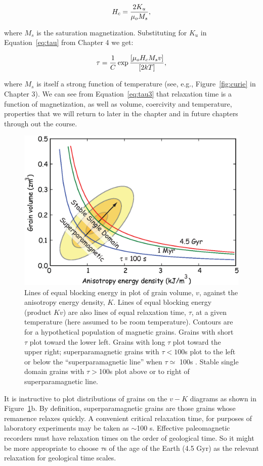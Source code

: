  $$H_c= {{2 K_u}\over{\mu_o M_s}},$$
 
 \noindent where $M_s$ is the saturation magnetization.  Substituting for $K_u$ in Equation~\ref{eq:tau} from Chapter 4  we get:

\begin{equation}
{\tau } =
{{1\over C} \exp {{[\mu_o H_c M_s v]}\over {[2kT]}}},
\label{eq:tau3}
\end{equation}

\noindent  where  $M_s$ is itself a  strong function of temperature (see, e.g., Figure~\ref{fig:curie} in Chapter 3).  
We can see from Equation~\ref{eq:tau3} that relaxation time is a function of  magnetization, as well as volume, coercivity and temperature, properties that we will return to later in the chapter and in future chapters through out the course.  

\begin{figure}[h!tb]
\centering  \includegraphics[width=8 cm]{EPSfiles/neel-vrm.eps}
\caption{Lines of equal blocking energy in plot of   grain
volume, $v$, against the anisotropy energy density, $K$. Lines of equal blocking energy (product $Kv$) are also lines of equal relaxation time, $\tau$, at a given temperature (here assumed to be room temperature).  Contours are for a hypothetical population of magnetic grains.  Grains with short $\tau$ plot toward the lower left. Grains with long $\tau$  plot toward the upper right; superparamagnetic grains with $\tau < 100$s  plot to the left or below the ``superparamagnetic line'' when $\tau \simeq$ 100s . Stable single domain grains
with $\tau > $100s plot above or to  right of  superparamagnetic line. }
\label{fig:neel-vrm}
\end{figure}



It is instructive to plot distributions of grains on the 
$v-K$ diagrams as shown in Figure~\ref{fig:neel-vrm}b.    
By definition, superparamagnetic grains are those grains whose remanence relaxes quickly. A convenient
critical relaxation time,  for purposes of laboratory experiments may be taken as $\sim$100 s.  Effective paleomagnetic recorders must have relaxation times on the order of geological time. So it
might be more appropriate to choose $\tau$s of the age of the Earth (4.5 Gyr)  as the relevant relaxation for geological time scales. 





